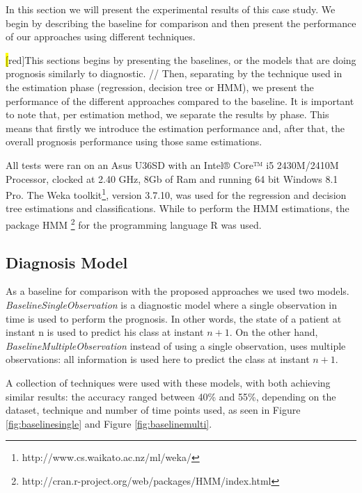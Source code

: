 In this section we will present the experimental results of this case study. We begin by describing the baseline for comparison and then present the performance of our approaches using different techniques.

\hl[red]{This sections begins by presenting the baselines, or the models that are doing prognosis similarly to diagnostic. // Then, separating by the technique used in the estimation phase (regression, decision tree or HMM), we present the performance of the different approaches compared to the baseline. It is important to note that, per estimation method, we separate the results by phase. This means that firstly we introduce the estimation performance and, after that, the overall prognosis performance using those same estimations. }

All tests were ran on an Asus U36SD with an Intel® Core™ i5 2430M/2410M Processor, clocked at 2.40 GHz, 8Gb of Ram and running 64 bit Windows 8.1 Pro.
The Weka toolkit\footnote{http://www.cs.waikato.ac.nz/ml/weka/}, version 3.7.10, was used for the regression and decision tree estimations and classifications. While to perform the HMM estimations, the package HMM \footnote{http://cran.r-project.org/web/packages/HMM/index.html} for the programming language R was used.

\subsection{Diagnosis Model}
\label{subsection:diagnosis}

As a baseline for comparison with the proposed approaches we used two models. \emph{BaselineSingleObservation} is a diagnostic model
 where a single observation in time is used to perform the prognosis. In other words, the state of a patient at instant n is
 used to predict his class at instant $n+1$. On the other hand, \emph{BaselineMultipleObservation} instead of using a single observation,
 uses multiple observations: all information is used here to predict the class at instant $n+1$.

A collection of techniques were used with these models, with both achieving similar results: the accuracy ranged between 40\% and 55\%,
 depending on the dataset, technique and number of time points used, as seen in Figure \ref{fig:baselinesingle} and Figure \ref{fig:baselinemulti}.
 
